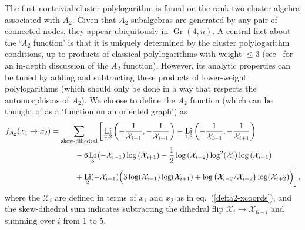 \documentclass[12pt]{article}
\DeclareMathOperator{\Gr}{Gr}
\DeclareMathOperator{\Li}{Li}
\def\x{\mathcal{X}}
\begin{document}
The first nontrivial cluster polylogarithm is found on the rank-two cluster algebra associated with $A_2$. Given that $A_2$ subalgebras are generated by any pair of connected nodes, they appear ubiquitously in $\Gr(4,n)$. A central fact about the `$A_2$ function' is that it is uniquely determined by the cluster polylogarithm conditions, up to products of classical polylogarithms with weight $\le3$ (see~\cite{Golden:2014xqa} for an in-depth discussion of the $A_2$ function). However, its analytic properties can be tuned by adding and subtracting these products of lower-weight polylogarithms (which should only be done in a way that respects the automorphisms of $A_2$). We choose to define the $A_2$ function (which can be thought of as a `function on an oriented graph') as
\begin{align}\label{def:a2-function}
        f_{A_2}(x_1 \to x_2)  &= \sum_{\text{skew-dihedral}} \bigg[ \Li_{2,2}\left(-\frac{1}{\x_{i-1}},-\frac{1}{\x_{i+1}}\right) - \Li_{1,3}\left(-\frac{1}{\x_{i-1}},-\frac{1}{\x_{i+1}}\right)  \\
        &\hspace{1.1cm} -6 \Li_3\left(-\x_{i-1}\right) \log \left(\x_{i+1}\right) -\frac{1}{2} \log \left(\x_{i-2}\right) \log^2\! \left(\x_i\right) \log \left(\x_{i+1}\right)  {\color{white} \bigg|} \nonumber \\
        &\hspace{1.1cm} +\Li_2(-\x_{i-1}) \Big(3 \log (\x_{i-1})\log (\x_{i+1})+\log \big(\x_{i-2}/\x_{i+2}\big)\log (\x_{i+2})\Big) \bigg], \nonumber
\end{align}
where the $\x_i$ are defined in terms of $x_1$ and $x_2$ as in eq.~(\ref{def:a2-xcoords}), and the skew-dihedral sum indicates subtracting the dihedral flip $\x_i \to \x_{6-i}$ and summing over $i$ from 1 to 5. 
\end{document}
